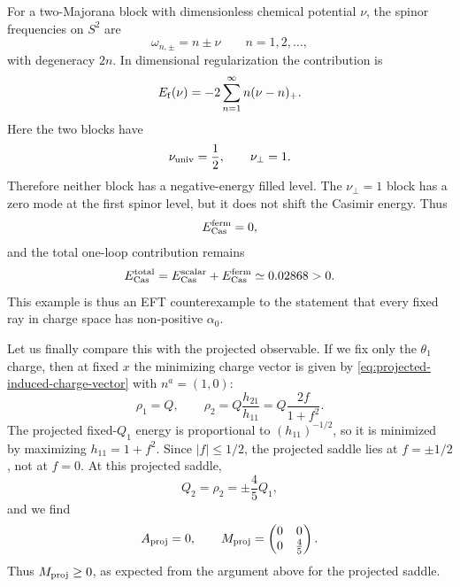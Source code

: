 \documentclass[a4paper,11pt]{article}
\begin{document}
For a two-Majorana block with dimensionless chemical potential $\nu$, the spinor frequencies on $S^2$ are
\begin{equation}
  \omega_{n,\pm} = n\pm\nu \qquad n=1,2,\ldots,
\end{equation}
with degeneracy $2n$. In dimensional regularization the contribution is
\begin{equation}
  E_{\rm f}(\nu) = -2 \sum_{n=1}^{\infty}n(\nu-n)_+ .
\end{equation}
Here the two blocks have
\begin{equation}
  \nu_{\rm univ}=\frac12, \qquad \nu_{\perp}=1.
\end{equation}
Therefore neither block has a negative-energy filled level. The $\nu_\perp=1$ block has a zero mode at the first spinor level, but it does not shift the Casimir energy. Thus
\begin{equation}
  E_{\rm Cas}^{\rm ferm}=0,
\end{equation}
and the total one-loop contribution remains
\begin{equation}\label{eq:counterexample-total-casimir}
    E_{\rm Cas}^{\rm total}
    =
    E_{\rm Cas}^{\rm scalar}
    +
    E_{\rm Cas}^{\rm ferm}
    \simeq
    0.02868
    >
    0 .
\end{equation}
This example is thus an EFT counterexample to the statement that every fixed ray in charge space has non-positive $\alpha_0$.

Let us finally compare this with the projected observable. If we fix only the $\theta_1$ charge, then at fixed $x$ the minimizing charge vector is given
by \eqref{eq:projected-induced-charge-vector} with $n^a=(1,0)$:
\begin{equation}
  \rho_1=Q, \qquad \rho_2 = Q\frac{h_{21}}{h_{11}} = Q\frac{2f}{1+f^2}.
\end{equation}
The projected fixed-$Q_1$ energy is proportional to $(h_{11})^{-1/2}$, so it is minimized by maximizing $h_{11}=1+f^2$. Since $|f|\leq 1/2$, the projected saddle lies at $f=\pm1/2$, not at $f=0$. At this projected saddle,
\begin{equation}
  Q_2=\rho_2=\pm\frac45 Q_1 ,
\end{equation}
and we find
\begin{equation}
    A_{\rm proj}=0,
    \qquad
    M_{\rm proj}
    =
    \begin{pmatrix}
    0&0\\
    0&\frac45
    \end{pmatrix}.
\end{equation}
Thus $M_{\rm proj}\geq0$, as expected from the argument above for the projected saddle.
\end{document}

